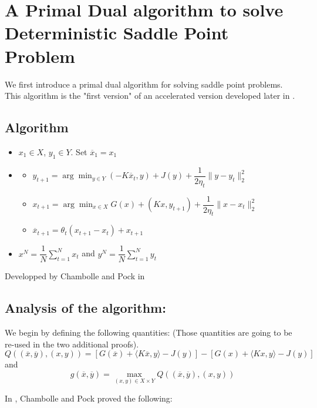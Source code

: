 \documentclass[12pt,reqno]{amsart}
\numberwithin{equation}{section}
\begin{document}
\section{A Primal Dual algorithm to solve Deterministic Saddle Point Problem }

We first introduce a primal dual algorithm for solving saddle point problems. This algorithm is the "first version" of an accelerated version developed later
in \cite{ChenLanOuyang}.

\subsection{Algorithm}

\begin{itemize}
\item $x_{1} \in X$, $y_{1} \in Y$. Set $\overline{x}_{1} = x_{1}$
\item

\begin{itemize}
\item $y_{t+1} = \arg\min_{y \in Y} (-K\overline{x}_{t},y) + J(y) + \dfrac{1}{2\eta_{t}} \lVert y - y_{t} \rVert_{2}^{2}$
\item $x_{t+1} = \arg\min_{x \in X} G(x) + (Kx,y_{t+1}) + \dfrac{1}{2\eta_{t}}\lVert x - x_{t} \rVert_{2}^{2} $
\item $\overline{x}_{t+1} = \theta_{t}(x_{t+1} - x_{t}) + x_{t+1}$
\end{itemize}

\item $x^{N} = \dfrac{1}{N}\sum_{t=1}^{N} x_{t}$ and $y^{N} = \dfrac{1}{N}\sum_{t=1}^{N} y_{t}$
\end{itemize}

Developped by Chambolle and Pock in \cite{ChambollePock}

\subsection{ Analysis of the algorithm: }

We begin by defining the following quantities:
(Those quantities are going to be re-used in the two additional proofs).
$$
Q((\overline{x},\overline{y}),(x,y)) = [G(\overline{x}) + \langle K\overline{x},y\rangle - J(y)] - [G(x) + \langle Kx,y\rangle - J(y)]
$$
and
$$
g(\overline{x},\overline{y}) = \max_{(x,y)\in X \times Y} Q((\overline{x},\overline{y}),(x,y))
$$


In \cite{ChambollePock}, Chambolle and Pock proved the following:
\end{document}
